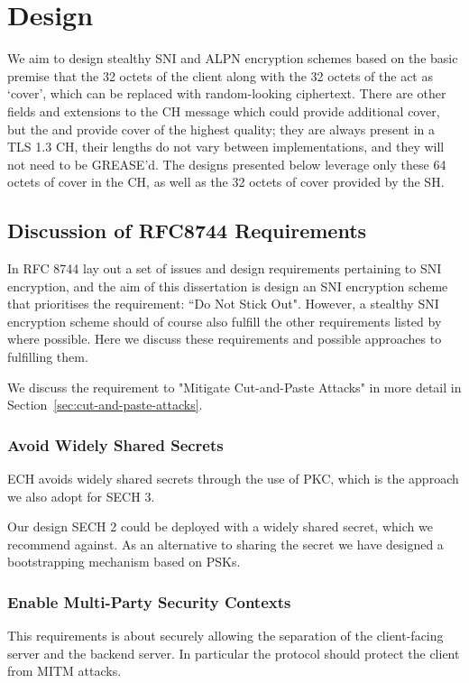\chapter{Design}
\label{chap:Design}

We aim to design stealthy \ac{SNI} and \ac{ALPN} encryption schemes based
on the basic premise that the 32 octets of the client 
along with the 32 octets of the \varlegacysessionid{} act as `cover',
which can be replaced with random-looking ciphertext.
There are other fields and extensions to the \ac{CH} message
which could provide additional cover,
but the  and \varlegacysessionid{}
provide cover of the highest quality; they are always present in a \ac{TLS} 1.3 \ac{CH},
their lengths do not vary between implementations, and they will not
need to be \ac{GREASE}'d.
The designs presented below leverage only these 64 octets of cover in the \ac{CH},
as well as the 32 octets of cover provided by the \ac{SH}.

\section{Discussion of RFC8744 Requirements}

In RFC 8744 \cite{rfc8744-issues} lay out a set of issues and design requirements pertaining to \ac{SNI} encryption, and the aim of this dissertation is design an \ac{SNI} encryption scheme that prioritises the requirement: ``Do Not Stick Out". However, a stealthy \ac{SNI} encryption scheme should of course also fulfill the other requirements listed by \cite{rfc8744-issues} where possible. Here we discuss these requirements and possible approaches to fulfilling them.


We discuss the requirement to "Mitigate Cut-and-Paste Attacks" in more detail in Section~\ref{sec:cut-and-paste-attacks}.

\subsection{Avoid Widely Shared Secrets}

\ac{ECH} avoids widely shared secrets through the use of \ac{PKC},
which is the approach we also adopt for
\ac{SECH} 3.

Our design \ac{SECH} 2
could be deployed with a widely shared secret,
which we recommend against.
As an alternative to sharing the secret
we have designed a bootstrapping mechanism
based on \ac{PSK}s.


\subsection{Enable Multi-Party Security Contexts}
This requirements is about securely allowing the separation of the client-facing server and the backend server. In particular the protocol should protect the client from \ac{MITM} attacks.

